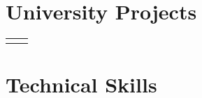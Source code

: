 \documentclass[
	10pt, %
]{FreemanCV}
\begin{document}
\begin{paracol}{2}
\section{University Projects} 




\begin{supertabular}{r l} %
	
	
	
	
	
\end{supertabular}


\section{Technical Skills} 




\begin{supertabular}{r l} %
	

\end{supertabular}
\end{paracol}
\end{document}
